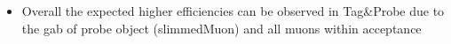 \documentclass{beamer}
\begin{document}
\begin{frame}
\begin{columns}
\begin{column}{0.33\textwidth}
   \end{column}
  \end{columns}
\begin{itemize}
 \item Overall the expected higher efficiencies can be observed in Tag\&Probe due to the gab of probe object (slimmedMuon) and all muons within acceptance
\end{itemize}

\end{frame}
\end{document}
